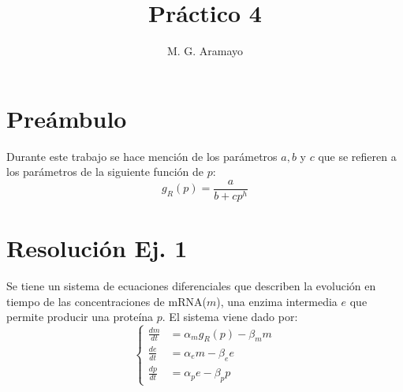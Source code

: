 \documentclass[twocolumn,aps,prl]{revtex4-1}
\begin{document}

\title{Práctico 4}
\author{M. G. Aramayo}


\maketitle



\section{Preámbulo}
Durante este trabajo se hace mención de los parámetros $a, b$ y $c$ que se refieren a los parámetros de la siguiente función de $p$:
\begin{equation}\label{eq:gr}
    g_{R}(p) = \frac{a}{b + c p^{h}}
\end{equation}

\section{Resolución Ej. 1}

Se tiene un sistema de ecuaciones diferenciales que describen la evolución en tiempo de las concentraciones de mRNA($m$), una enzima intermedia $e$ que permite producir una proteína $p$. El sistema viene dado por:
\begin{equation}\label{eq:ecuaciones}
  \left\lbrace 
  \begin{aligned}
    \frac{d m}{d t} &= \alpha_{m} g_{R}(p)-\beta_{m} m \\
    \frac{d e}{d t} &= \alpha_{e} m-\beta_{e} e \\
    \frac{d p}{d t} &= \alpha_{p} e-\beta_{p} p
  \end{aligned}\right.
\end{equation}
\end{document}

